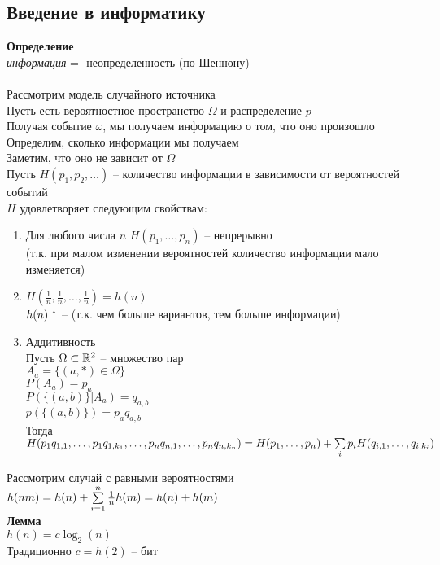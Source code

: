 \documentclass[12pt]{article}
\begin{document}
\subsection{Введение в информатику}
\textbf{Определение}\\
\textit{информация} = -неопределенность (по Шеннону)\\\\
Рассмотрим модель случайного источника\\
Пусть есть вероятностное пространство $\Omega$ и распределение $p$\\
Получая событие $\omega$, мы получаем информацию о том, что оно произошло\\
Определим, сколько информации мы получаем\\
Заметим, что оно не зависит от $\Omega$\\
Пусть $H(p_1, p_2, \ldots)$ -- количество информации в зависимости от вероятностей событий\\
$H$ удовлетворяет следующим свойствам:\\
\begin{enumerate}
    \item Для любого числа $n$ $H(p_1, \ldots, p_n)$ -- непрерывно\\
    (т.к. при малом изменении вероятностей количество информации мало изменяется)
    \item $H(\frac1n, \frac1n, \ldots, \frac1n) = h(n)$\\
    $h(n) \uparrow$ -- (т.к. чем больше вариантов, тем больше информации)
    \item Аддитивность\\
    Пусть $\Omega \subset \mathbb{R}^2$ -- множество пар\\
    $A_a = \{ (a,*) \in \Omega \}$\\
    $P(A_a) = p_a$\\
    $P(\{(a,b)\} | A_a) = q_{a,b}$\\
    $p(\{(a,b)\}) = p_a q_{a,b}$\\
    Тогда $H(p_1q_{1,1}, \ldots, p_1q_{1,k_1}, \ldots, p_nq_{n,1}, \ldots, p_nq_{n,k_n}) = H(p_1, \ldots, p_n) + \sum\limits_{i} p_i H(q_{i,1}, \ldots, q_{i,k_i})$
\end{enumerate}
Рассмотрим случай с равными вероятностями\\
$h(nm) = h(n) + \sum\limits_{i=1}^n \frac1n h(m) = h(n) + h(m)$\\
\textbf{Лемма}\\
$h(n) = c\log_2(n)$\\
Традиционно $c=h(2)$ -- бит\\
\end{document}
